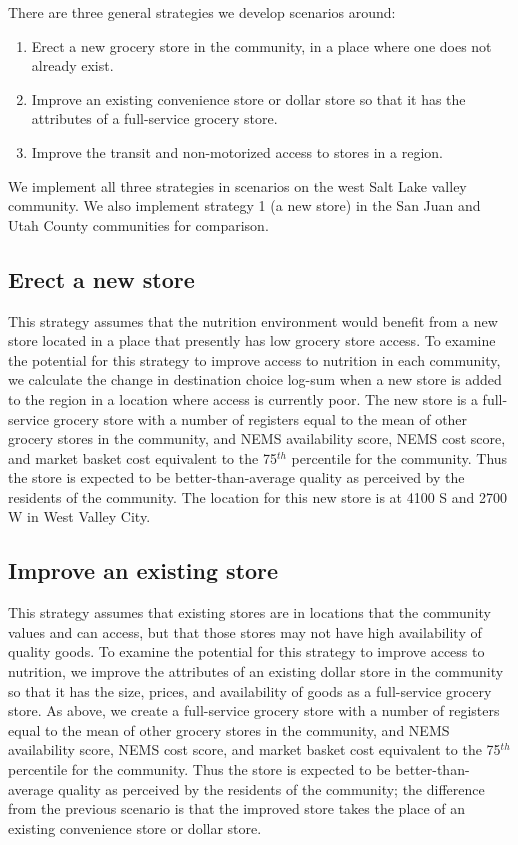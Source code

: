 \documentclass[
  letterpaper,
  DIV=11,
  numbers=noendperiod]{scrreport}
\providecommand{\tightlist}{%
  \setlength{\itemsep}{0pt}\setlength{\parskip}{0pt}}\usepackage{longtable,booktabs,array}
\begin{document}
There are three general strategies we develop scenarios around:

\begin{enumerate}
\def\labelenumi{\arabic{enumi}.}
\tightlist
\item
  Erect a new grocery store in the community, in a place where one does
  not already exist.
\item
  Improve an existing convenience store or dollar store so that it has
  the attributes of a full-service grocery store.
\item
  Improve the transit and non-motorized access to stores in a region.
\end{enumerate}

We implement all three strategies in scenarios on the west Salt Lake
valley community. We also implement strategy 1 (a new store) in the San
Juan and Utah County communities for comparison.

\hypertarget{erect-a-new-store}{%
\subsection{Erect a new store}\label{erect-a-new-store}}

This strategy assumes that the nutrition environment would benefit from
a new store located in a place that presently has low grocery store
access. To examine the potential for this strategy to improve access to
nutrition in each community, we calculate the change in destination
choice log-sum when a new store is added to the region in a location
where access is currently poor. The new store is a full-service grocery
store with a number of registers equal to the mean of other grocery
stores in the community, and NEMS availability score, NEMS cost score,
and market basket cost equivalent to the 75\(^{th}\) percentile for the
community. Thus the store is expected to be better-than-average quality
as perceived by the residents of the community. The location for this
new store is at 4100 S and 2700 W in West Valley City.

\hypertarget{improve-an-existing-store}{%
\subsection{Improve an existing store}\label{improve-an-existing-store}}

This strategy assumes that existing stores are in locations that the
community values and can access, but that those stores may not have high
availability of quality goods. To examine the potential for this
strategy to improve access to nutrition, we improve the attributes of an
existing dollar store in the community so that it has the size, prices,
and availability of goods as a full-service grocery store. As above, we
create a full-service grocery store with a number of registers equal to
the mean of other grocery stores in the community, and NEMS availability
score, NEMS cost score, and market basket cost equivalent to the
75\(^{th}\) percentile for the community. Thus the store is expected to
be better-than-average quality as perceived by the residents of the
community; the difference from the previous scenario is that the
improved store takes the place of an existing convenience store or
dollar store.
\end{document}
